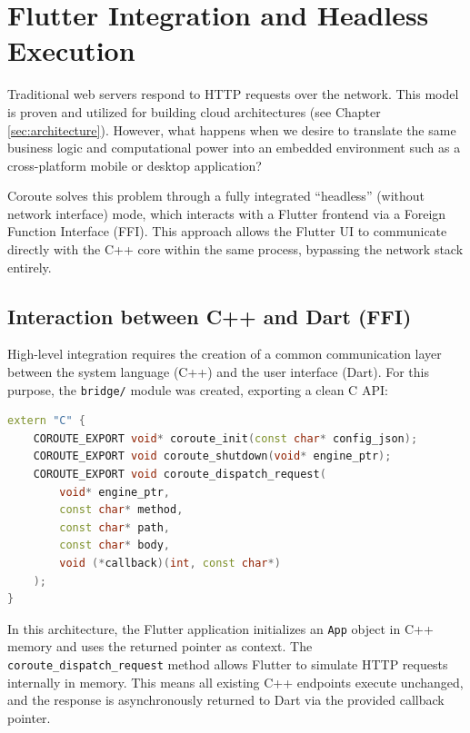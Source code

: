 \section{Flutter Integration and Headless Execution}
\label{sec:flutter-integration}

Traditional web servers respond to HTTP requests over the network. This model is proven and utilized for building cloud architectures (see Chapter \ref{sec:architecture}). However, what happens when we desire to translate the same business logic and computational power into an embedded environment such as a cross-platform mobile or desktop application?

Coroute solves this problem through a fully integrated ``headless'' (without network interface) mode, which interacts with a Flutter frontend via a Foreign Function Interface (FFI). This approach allows the Flutter UI to communicate directly with the C++ core within the same process, bypassing the network stack entirely.

\subsection{Interaction between C++ and Dart (FFI)}
High-level integration requires the creation of a common communication layer between the system language (C++) and the user interface (Dart). For this purpose, the \texttt{bridge/} module was created, exporting a clean C API:

\begin{lstlisting}[language=C++, basicstyle=\small\ttfamily, caption={Exporting C functions from Coroute}]
extern "C" {
    COROUTE_EXPORT void* coroute_init(const char* config_json);
    COROUTE_EXPORT void coroute_shutdown(void* engine_ptr);
    COROUTE_EXPORT void coroute_dispatch_request(
        void* engine_ptr, 
        const char* method, 
        const char* path, 
        const char* body, 
        void (*callback)(int, const char*)
    );
}
\end{lstlisting}

In this architecture, the Flutter application initializes an \texttt{App} object in C++ memory and uses the returned pointer as context. The \texttt{coroute\_dispatch\_request} method allows Flutter to simulate HTTP requests internally in memory. This means all existing C++ endpoints execute unchanged, and the response is asynchronously returned to Dart via the provided callback pointer.

